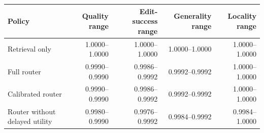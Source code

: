 \begin{tabular}{lrrrr}
\toprule
Policy & Quality range & Edit-success range & Generality range & Locality range \\
\midrule
Retrieval only & 1.0000--1.0000 & 1.0000--1.0000 & 1.0000--1.0000 & 1.0000--1.0000 \\
Full router & 0.9990--0.9990 & 0.9986--0.9992 & 0.9992--0.9992 & 1.0000--1.0000 \\
Calibrated router & 0.9990--0.9990 & 0.9986--0.9992 & 0.9992--0.9992 & 1.0000--1.0000 \\
Router without delayed utility & 0.9980--0.9990 & 0.9976--0.9992 & 0.9984--0.9992 & 0.9984--1.0000 \\
\bottomrule
\end{tabular}
